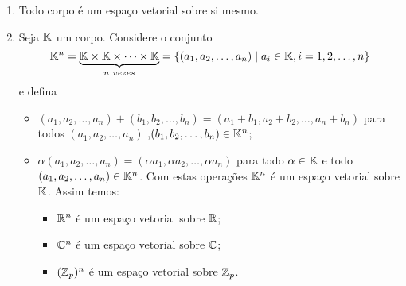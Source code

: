 \begin{exemplo}
	\begin{enumerate}[label={\arabic*})]
		\item Todo corpo \'e um espa\c{c}o vetorial sobre si mesmo.
		\item Seja $\mathbb{K}$ um corpo. Considere o conjunto
		\[
			\mathbb{K}^n = \underbrace{\mathbb{K} \times \mathbb{K} \times \cdots \times \mathbb{K}}_{n\ vezes} = \{(a_1, a_2,\dots,a_n) \mid a_i \in \mathbb{K}, i =1, 2, \dots, n\}
		\]
		e defina
		\begin{itemize}
			\item $(a_1, a_2, \dots, a_n) + (b_1, b_2, \dots,b_n) = (a_1 + b_1, a_2 + b_2,\dots, a_n + b_n)$ para todos $(a_1, a_2, \dots,a_n)$ ,$(b_1, b_2, \dots,b_n) \in \mathbb{K}^n$;
			\item $\alpha (a_1, a_2, \dots,a_n) = (\alpha a_1, \alpha a_2, \dots, \alpha a_n)$ para todo $\alpha \in \mathbb{K}$ e todo $(a_1, a_2, \dots, a_n) \in \mathbb{K}^n$.
			Com estas opera\c{c}\~oes $\mathbb{K}^n$ \'e um espa\c{c}o vetorial sobre $\mathbb{K}$. Assim temos:
			\begin{itemize}
				\item $\mathbb{R}^n$ \'e um espa\c{c}o vetorial sobre $\mathbb{R}$;
				\item $\mathbb{C}^n$ \'e um espa\c{c}o vetorial sobre $\mathbb{C}$;
				\item $(\mathbb{Z}_p)^n$ \'e um espa\c{c}o vetorial sobre $\mathbb{Z}_p$.
			\end{itemize}


\end{itemize}
\end{enumerate}
\end{exemplo}
